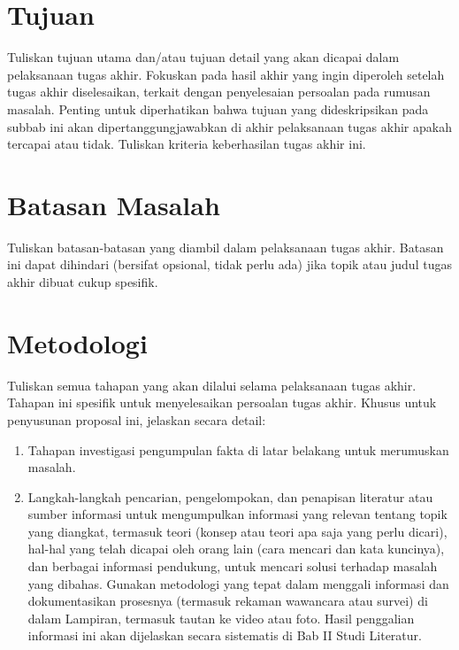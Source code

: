 \documentclass[12pt,a4paper,oneside]{book}
\begin{document}
\section{Tujuan}
Tuliskan tujuan utama dan/atau tujuan detail yang akan dicapai dalam pelaksanaan tugas akhir. Fokuskan pada hasil akhir yang ingin diperoleh setelah tugas akhir diselesaikan, terkait dengan penyelesaian persoalan pada rumusan masalah. Penting untuk diperhatikan bahwa tujuan yang dideskripsikan pada subbab ini akan dipertanggungjawabkan di akhir pelaksanaan tugas akhir apakah tercapai atau tidak. Tuliskan kriteria keberhasilan tugas akhir ini.

\section{Batasan Masalah}
Tuliskan batasan-batasan yang diambil dalam pelaksanaan tugas akhir. Batasan ini dapat dihindari (bersifat opsional, tidak perlu ada) jika topik atau judul tugas akhir dibuat cukup spesifik.

\section{Metodologi}
Tuliskan semua tahapan yang akan dilalui selama pelaksanaan tugas akhir. Tahapan ini spesifik untuk menyelesaikan persoalan tugas akhir. Khusus untuk penyusunan proposal ini, jelaskan secara detail:
\begin{enumerate}
\item	Tahapan investigasi pengumpulan fakta di latar belakang untuk merumuskan masalah.
\item	Langkah-langkah pencarian, pengelompokan, dan penapisan literatur atau sumber informasi untuk mengumpulkan informasi yang relevan tentang topik yang diangkat, termasuk teori (konsep atau teori apa saja yang perlu dicari), hal-hal yang telah dicapai oleh orang lain (cara mencari dan kata kuncinya), dan berbagai informasi pendukung, untuk mencari solusi terhadap masalah yang dibahas. Gunakan metodologi yang tepat dalam menggali informasi dan dokumentasikan prosesnya (termasuk rekaman wawancara atau survei) di dalam Lampiran, termasuk tautan ke video atau foto. Hasil penggalian informasi ini akan dijelaskan secara sistematis di Bab II Studi Literatur.
\end{enumerate}

\end{document}
